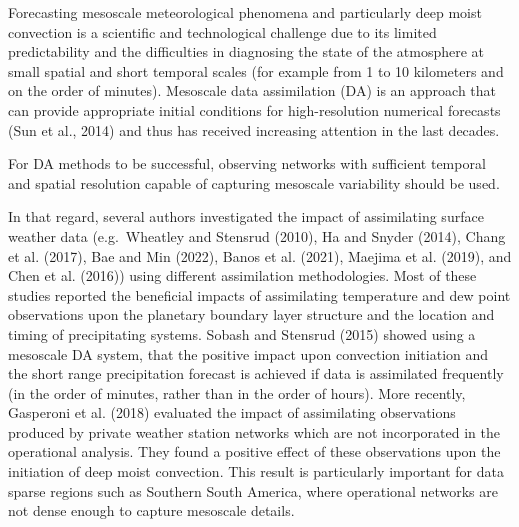 \documentclass[final,5p,times,twocolumn,authoryear]{elsarticle} %
\begin{document}
Forecasting mesoscale meteorological phenomena and particularly deep moist convection is a scientific and technological challenge due to its limited predictability and the difficulties in diagnosing the state of the atmosphere at small spatial and short temporal scales (for example from 1 to 10 kilometers and on the order of minutes). Mesoscale data assimilation (DA) is an approach that can provide appropriate initial conditions for high-resolution numerical forecasts (Sun et al., 2014) and thus has received increasing attention in the last decades.

For DA methods to be successful, observing networks with sufficient temporal and spatial resolution capable of capturing mesoscale variability should be used.

In that regard, several authors investigated the impact of assimilating surface weather data (e.g.~Wheatley and Stensrud (2010), Ha and Snyder (2014), Chang et al. (2017), Bae and Min (2022), Banos et al. (2021), Maejima et al. (2019), and Chen et al. (2016)) using different assimilation methodologies. Most of these studies reported the beneficial impacts of assimilating temperature and dew point observations upon the planetary boundary layer structure and the location and timing of precipitating systems. Sobash and Stensrud (2015) showed using a mesoscale DA system, that the positive impact upon convection initiation and the short range precipitation forecast is achieved if data is assimilated frequently (in the order of minutes, rather than in the order of hours). More recently, Gasperoni et al. (2018) evaluated the impact of assimilating observations produced by private weather station networks which are not incorporated in the operational analysis. They found a positive effect of these observations upon the initiation of deep moist convection. This result is particularly important for data sparse regions such as Southern South America, where operational networks are not dense enough to capture mesoscale details.
\end{document}
